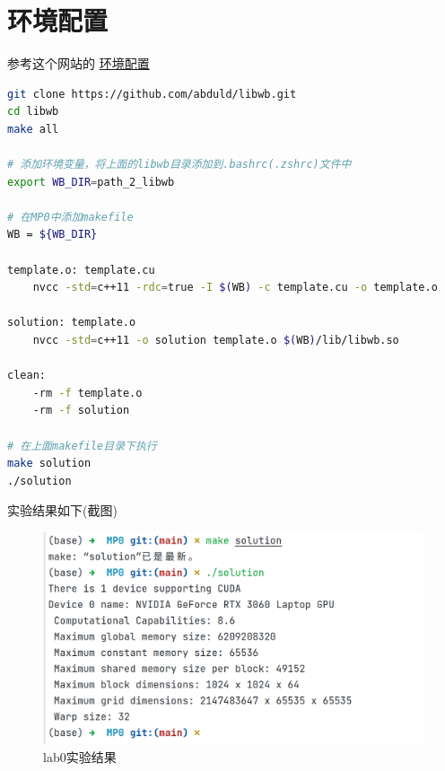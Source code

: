\documentclass[UTF8]{ctexart}
\begin{document}
\section{环境配置}

参考这个网站的
\href{http://doraemonzzz.com/2022/12/25/2022-12-25-ECE408-\%E7\%8E\%AF\%E5\%A2\%83\%E9\%85\%8D\%E7\%BD\%AE\%E4\%BB\%A5\%E5\%8F\%8ALab-0/#Lab-0}{环境配置}\\



\begin{lstlisting}[language=bash]
git clone https://github.com/abduld/libwb.git
cd libwb
make all

# 添加环境变量，将上面的libwb目录添加到.bashrc(.zshrc)文件中
export WB_DIR=path_2_libwb

# 在MP0中添加makefile
WB = ${WB_DIR}

template.o: template.cu
	nvcc -std=c++11 -rdc=true -I $(WB) -c template.cu -o template.o

solution: template.o
	nvcc -std=c++11 -o solution template.o $(WB)/lib/libwb.so

clean:
	-rm -f template.o
	-rm -f solution

# 在上面makefile目录下执行
make solution
./solution
\end{lstlisting}

\newpage
实验结果如下(截图)
\begin{figure}[ht]
    \centering
    \includegraphics[width=1.0\textwidth]{photos/lab0.png}
    \caption{lab0实验结果}
    \label{fig:1}
\end{figure}
\end{document}
